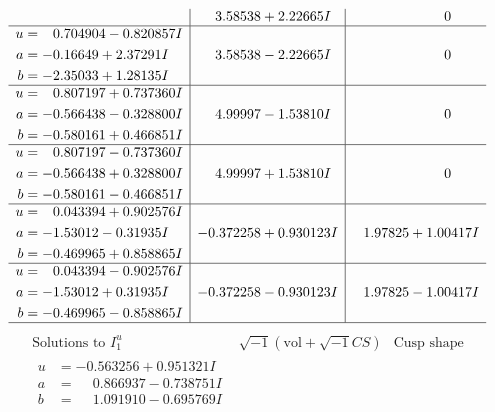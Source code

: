 \documentclass[1p]{elsarticle_modified}
\theoremstyle{definition}
\newcommand{\I}{\sqrt{-1}}
\begin{document}
$$\begin{array}{c|c|c}
 & \phantom{-}3.58538 + 2.22665 I & \phantom{-0.000000 } 0 \\ \hline\begin{aligned}
u &= \phantom{-}0.704904 - 0.820857 I \\
a &= -0.16649 + 2.37291 I \\
b &= -2.35033 + 1.28135 I\end{aligned}
 & \phantom{-}3.58538 - 2.22665 I & \phantom{-0.000000 } 0 \\ \hline\begin{aligned}
u &= \phantom{-}0.807197 + 0.737360 I \\
a &= -0.566438 - 0.328800 I \\
b &= -0.580161 + 0.466851 I\end{aligned}
 & \phantom{-}4.99997 - 1.53810 I & \phantom{-0.000000 } 0 \\ \hline\begin{aligned}
u &= \phantom{-}0.807197 - 0.737360 I \\
a &= -0.566438 + 0.328800 I \\
b &= -0.580161 - 0.466851 I\end{aligned}
 & \phantom{-}4.99997 + 1.53810 I & \phantom{-0.000000 } 0 \\ \hline\begin{aligned}
u &= \phantom{-}0.043394 + 0.902576 I \\
a &= -1.53012 - 0.31935 I \\
b &= -0.469965 + 0.858865 I\end{aligned}
 & -0.372258 + 0.930123 I & \phantom{-}1.97825 + 1.00417 I \\ \hline\begin{aligned}
u &= \phantom{-}0.043394 - 0.902576 I \\
a &= -1.53012 + 0.31935 I \\
b &= -0.469965 - 0.858865 I\end{aligned}
 & -0.372258 - 0.930123 I & \phantom{-}1.97825 - 1.00417 I\\
 \hline 
 \end{array}$$\newpage$$\begin{array}{c|c|c}  
\text{Solutions to }I^u_{1}& \I (\text{vol} + \sqrt{-1}CS) & \text{Cusp shape}\\
 \hline 
\begin{aligned}
u &= -0.563256 + 0.951321 I \\
a &= \phantom{-}0.866937 - 0.738751 I \\
b &= \phantom{-}1.091910 - 0.695769 I\end{aligned}

\end{array}$$
\end{document}
